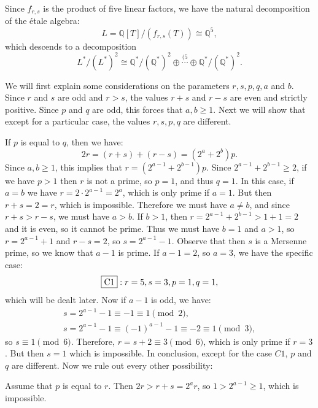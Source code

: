 \documentclass[a4paper, 12pt]{amsart}
\theoremstyle{definition}
\theoremstyle{plain}
\theoremstyle{plain}
\theoremstyle{plain}
\theoremstyle{plain}
\theoremstyle{remark}
\theoremstyle{remark}
\theoremstyle{plain}
\newcommand{\Q}{\mathbb{Q}}
\begin{document}
	Since $f_{r,s}$ is the product of five linear factors, we have the natural decomposition of the étale algebra:
	\begin{equation*}
		L=\Q[T]/(f_{r,s}(T))\cong \Q^5,
	\end{equation*}
	which descends to a decomposition
	\begin{equation*}
		L^*/(L^*)^2\cong \Q^*/(\Q^*)^2\oplus \overset{(5}{\cdots}\oplus \Q^*/(\Q^*)^2.
	\end{equation*}
	
	We will first explain some considerations on the parameters $r,s,p,q,a$ and $b$. Since $r$ and $s$ are odd and $r>s$, the values $r+s$ and $r-s$ are even and strictly positive. Since $p$ and $q$ are odd, this forces that $a,b\ge 1$. Next we will show that except for a particular case, the values $r,s,p,q$ are different.
	
	If $p$ is equal to $q$, then we have:
	\begin{equation*}
		2r=(r+s)+(r-s)=(2^a+2^b)p.
	\end{equation*}
	Since $a,b\ge 1$, this implies that $r=(2^{a-1}+2^{b-1})p$. Since $2^{a-1}+2^{b-1}\ge 2$, if we have $p>1$ then $r$ is not a prime, so $p=1$, and thus $q=1$. In this case, if $a=b$ we have $r=2\cdot 2^{a-1}=2^a$, which is only prime if $a=1$. But then $r+s=2=r$, which is impossible. Therefore we must have $a\neq b$, and since $r+s>r-s$, we must have $a>b$. If $b>1$, then $r=2^{a-1}+2^{b-1}>1+1=2$ and it is even, so it cannot be prime. Thus we must have $b=1$ and $a>1$, so $r=2^{a-1}+1$ and $r-s=2$, so $s=2^{a-1}-1$. Observe that then $s$ is a Mersenne prime, so we know that $a-1$ is prime. If $a-1=2$, so $a=3$, we have the specific case:
	\begin{equation*}
		\fbox{C1}: r=5,s=3,p=1,q=1,
	\end{equation*}
	which will be dealt later. Now if $a-1$ is odd, we have:
	\begin{gather*}
		s=2^{a-1}-1\equiv -1\equiv 1\pmod 2,\\
		s=2^{a-1}-1\equiv (-1)^{a-1}-1\equiv -2\equiv 1\pmod 3,
	\end{gather*}
	so $s\equiv 1\pmod 6$. Therefore, $r=s+2\equiv 3\pmod6$, which is only prime if $r=3$. But then $s=1$ which is impossible. In conclusion, except for the case $C1$, $p$ and $q$ are different. Now we rule out every other possibility:
	
	Assume that $p$ is equal to $r$. Then $2r>r+s=2^ar$, so $1>2^{a-1}\ge 1$, which is impossible.
	
\end{document}
